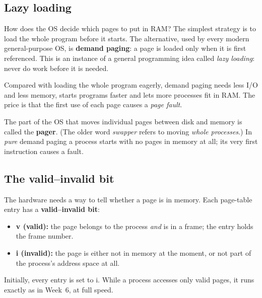 \documentclass[11pt,a4paper]{article}
\newcommand{\term}[1]{\textbf{\color{mintdeep}#1}}
\begin{document}
\subsection{Lazy loading}

How does the OS decide which pages to put in RAM? The simplest strategy is to load the whole program before it starts. The alternative, used by every modern general-purpose OS, is \term{demand paging}: a page is loaded only when it is first referenced. This is an instance of a general programming idea called \emph{lazy loading}: never do work before it is needed.

Compared with loading the whole program eagerly, demand paging needs less I/O and less memory, starts programs faster and lets more processes fit in RAM. The price is that the first use of each page causes a \emph{page fault}.

The part of the OS that moves individual pages between disk and memory is called the \term{pager}. (The older word \emph{swapper} refers to moving \emph{whole processes}.) In \emph{pure} demand paging a process starts with no pages in memory at all; its very first instruction causes a fault.

\subsection{The valid--invalid bit}

The hardware needs a way to tell whether a page is in memory. Each page-table entry has a \term{valid--invalid bit}:
\begin{itemize}
  \item \textbf{v (valid):} the page belongs to the process \emph{and} is in a frame; the entry holds the frame number.
  \item \textbf{i (invalid):} the page is either not in memory at the moment, or not part of the process's address space at all.
\end{itemize}
Initially, every entry is set to i. While a process accesses only valid pages, it runs exactly as in Week~6, at full speed.
\end{document}
